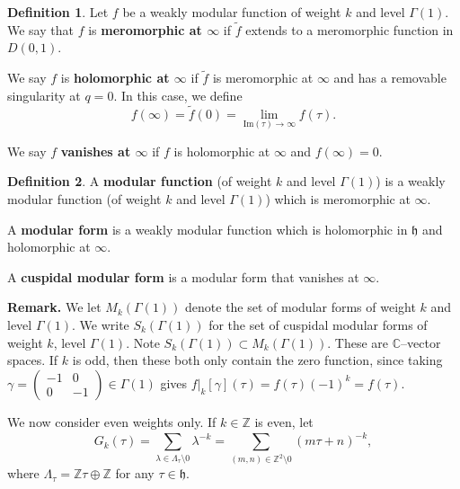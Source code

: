\documentclass{article}
\theoremstyle{definition}
\newtheorem{defn}{Definition}[section]
\begin{document}
\begin{defn}
    Let $f$ be a weakly modular function of weight $k$ and level $\Gamma(1)$. We say that $f$ is \textbf{meromorphic at $\infty$} if $\tilde{f}$ extends to a meromorphic function in $D(0,1)$. \vspace{1mm}
     
    We say $f$ is \textbf{holomorphic at $\infty$} if $\tilde{f}$ is meromorphic at $\infty$ and has a removable singularity at $q = 0$. In this case, we define $$f(\infty) = \tilde{f}(0) = \lim_{\text{Im}(\tau) \to \infty}f(\tau).$$
    \vspace{1mm}
     
    We say $f$ \textbf{vanishes at $\infty$} if $f$ is holomorphic at $\infty$ and $f(\infty)=0$.
\end{defn}
\begin{defn}
    A \textbf{modular function} (of weight $k$ and level $\Gamma(1)$) is a weakly modular function (of weight $k$ and level $\Gamma(1)$) which is meromorphic at $\infty$.
    \vspace{1mm}
     
    A \textbf{modular form} is a weakly modular function which is holomorphic in $\mathfrak{h}$ and holomorphic at $\infty$.
    \vspace{1mm}
     
    A \textbf{cuspidal modular form} is a modular form that vanishes at $\infty$.
\end{defn}

\textbf{Remark.} We let $M_k(\Gamma(1))$ denote the set of modular forms of weight $k$ and level $\Gamma(1)$. We write $S_k(\Gamma(1))$ for the set of cuspidal modular forms of weight $k$, level $\Gamma(1)$. Note $S_k(\Gamma(1)) \subset M_k(\Gamma(1))$. These are $\mathbb{C}$--vector spaces. If $k$ is odd, then these both only contain the zero function, since taking $\gamma = \begin{pmatrix} -1 & 0 \\ 0 & -1 \end{pmatrix} \in \Gamma(1)$ gives $f|_k[\gamma](\tau) = f(\tau)(-1)^k = f(\tau)$.
\vspace{1mm}
 
We now consider even weights only. If $k \in \mathbb{Z}$ is even, let \[
G_k(\tau) = \sum_{\lambda \in \Lambda_\tau \setminus 0}^{} \lambda^{-k} = \sum_{(m,n) \in \mathbb{Z}^2 \setminus  0}^{} (m \tau + n)^{-k},
\]
where $\Lambda_\tau = \mathbb{Z} \tau \oplus \mathbb{Z}$ for any $\tau \in \mathfrak{h}$. 
\vspace{1mm}
 
\end{document}
